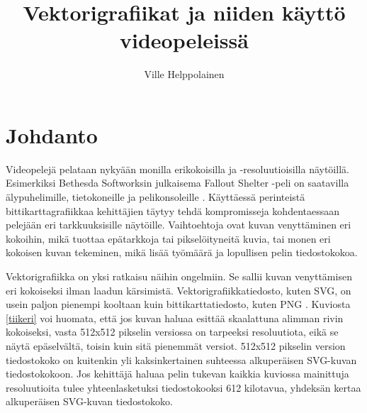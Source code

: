 \documentclass[utf8,bachelor]{gradu3}
\begin{document}
\title{Vektorigrafiikat ja niiden käyttö videopeleissä}


\author{Ville Helppolainen}

\maketitle

\mainmatter


\chapter{Johdanto}

Videopelejä pelataan nykyään monilla erikokoisilla ja -resoluutioisilla näytöillä. Esimerkiksi Bethesda Softworksin julkaisema Fallout Shelter -peli on saatavilla älypuhelimille, tietokoneille ja pelikonsoleille \parencite{RefWorks:doc:5bd6d887e4b0a1f99c62e6de}. Käyttäessä perinteistä bittikarttagrafiikkaa kehittäjien täytyy tehdä kompromisseja kohdentaessaan pelejään eri tarkkuuksisille näytöille. Vaihtoehtoja ovat kuvan venyttäminen eri kokoihin, mikä tuottaa epätarkkoja tai pikselöityneitä kuvia, tai monen eri kokoisen kuvan tekeminen, mikä lisää työmäärä ja lopullisen pelin tiedostokokoa. \parencite{RefWorks:doc:5bd8319de4b03ae5c9b276b8}

Vektorigrafiikka on yksi ratkaisu näihin ongelmiin. Se sallii kuvan venyttämisen eri kokoiseksi ilman laadun kärsimistä. Vektorigrafiikkatiedosto, kuten SVG, on usein paljon pienempi kooltaan kuin bittikarttatiedosto, kuten PNG \parencites{RefWorks:doc:5bdc5224e4b05afcfde5b159}{RefWorks:doc:5bdc5292e4b05afcfde5b171}. Kuviosta \ref{tiikeri} voi huomata, että jos kuvan haluaa esittää skaalattuna alimman rivin kokoiseksi, vasta 512x512 pikselin versiossa on tarpeeksi resoluutiota, eikä se näytä epäselvältä, toisin kuin sitä pienemmät versiot. 512x512 pikselin version tiedostokoko on kuitenkin yli kaksinkertainen suhteessa alkuperäisen SVG-kuvan tiedostokokoon. Jos kehittäjä haluaa pelin tukevan kaikkia kuviossa mainittuja resoluutioita tulee yhteenlasketuksi tiedostokooksi 612 kilotavua, yhdeksän kertaa alkuperäisen SVG-kuvan tiedostokoko.
\end{document}
